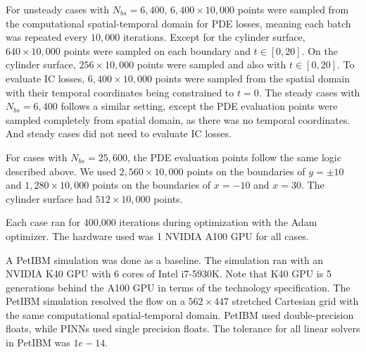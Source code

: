For unsteady cases with $N_{bs}=6,400$, $6,400\times 10,000$ points were sampled from the computational spatial-temporal domain for PDE losses, meaning each batch was repeated every $10,000$ iterations.
Except for the cylinder surface, $640\times 10,000$ points were sampled on each boundary and $t\in[0, 20]$.
On the cylinder surface, $256\times 10,000$ points were sampled and also with $t\in[0, 20]$.
To evaluate IC losses, $6,400\times 10,000$ points were sampled from the spatial domain with their temporal coordinates being constrained to $t=0$.
The steady cases with $N_{bs}=6,400$ follows a similar setting, except the PDE evaluation points were sampled completely from spatial domain, as there was no temporal coordinates.
And steady cases did not need to evaluate IC losses.

For cases with $N_{bs}=25,600$, the PDE evaluation points follow the same logic described above.
We used $2,560\times 10,000$ points on the boundaries of $y=\pm 10$ and $1,280\times 10,000$ points on the boundaries of $x=-10$ and $x=30$.
The cylinder surface had $512\times 10,000$ points.

Each case ran for 400,000 iterations during optimization with the Adam optimizer.
The hardware used was 1 NVIDIA A100 GPU for all cases.

A PetIBM simulation was done as a baseline.
The simulation ran with an NVIDIA K40 GPU with 6 cores of Intel i7-5930K.
Note that K40 GPU is 5 generations behind the A100 GPU in terms of the technology specification.
The PetIBM simulation resolved the flow on a $562 \times 447$ stretched Cartesian grid with the same computational spatial-temporal domain.
PetIBM used double-precision floats, while PINNs used single precision floats.
The tolerance for all linear solvers in PetIBM was $1e-14$.
